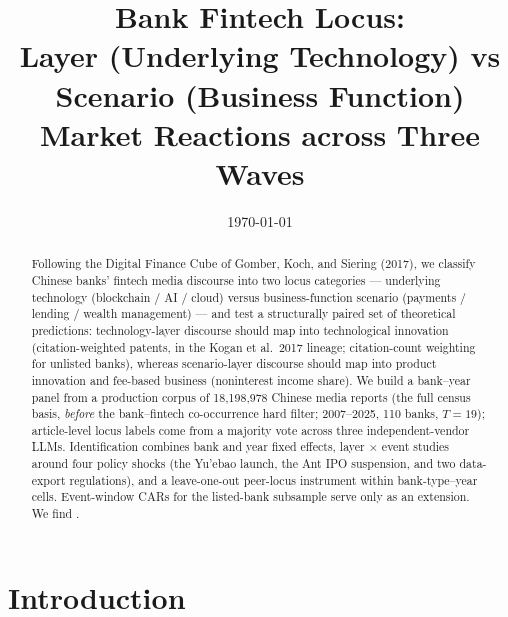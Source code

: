 




\title{Bank Fintech Locus:\\Layer (Underlying Technology) vs Scenario (Business Function) Market Reactions across Three Waves}
\author{}
\date{\today}


\maketitle

\begin{abstract}
Following the Digital Finance Cube of Gomber, Koch, and Siering (2017), we classify
Chinese banks' fintech media discourse into two locus categories — underlying technology
(blockchain / AI / cloud) versus business-function scenario (payments / lending / wealth
management) — and test a structurally paired set of theoretical predictions:
technology-layer discourse should map into technological innovation (citation-weighted
patents, in the Kogan et al.\ 2017 lineage; citation-count weighting for unlisted banks),
whereas scenario-layer discourse should map into product innovation and fee-based
business (noninterest income share). We build a bank--year panel from a production corpus
of 18{,}198{,}978 Chinese media reports (the full census basis, \emph{before} the
bank--fintech co-occurrence hard filter; 2007--2025, 110 banks,
$T=19$); article-level locus labels
come from a majority vote across three independent-vendor LLMs. Identification combines
bank and year fixed effects, layer $\times$ event studies around four policy shocks (the
Yu'ebao launch, the Ant IPO suspension, and two data-export regulations), and a
leave-one-out peer-locus instrument within bank-type--year cells. Event-window CARs for
the listed-bank subsample serve only as an extension. We find \@.
\end{abstract}

\section{Introduction}\label{sec:intro}

